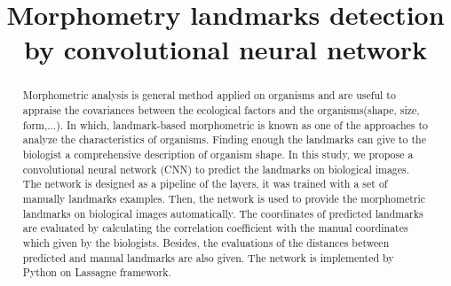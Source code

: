 \documentclass[conference]{IEEEtran}
\begin{document}
\title{Morphometry landmarks detection by convolutional neural network}

\author{
\and
{}
\and
{}
\and
{}

}

\maketitle

\begin{abstract}
Morphometric analysis is general method applied on organisms and are useful to appraise the covariances between the ecological factors and the organisms(shape, size, form,...). In which, landmark-based morphometric is known as one of the approaches to analyze the characteristics of organisms. Finding enough the landmarks can give to the biologist a comprehensive description of organism shape. In this study, we propose a convolutional neural network (CNN) to predict the landmarks on biological images. The network is designed as a pipeline of the layers, it was trained with a set of manually landmarks examples. Then, the network is used to provide the morphometric landmarks on biological images automatically. The coordinates of predicted landmarks are evaluated by calculating the correlation coefficient with the manual coordinates which given by the biologists. Besides, the evaluations of the distances between predicted and manual landmarks are also given. The network is implemented by Python on Lassagne framework.
\end{abstract}
\end{document}
